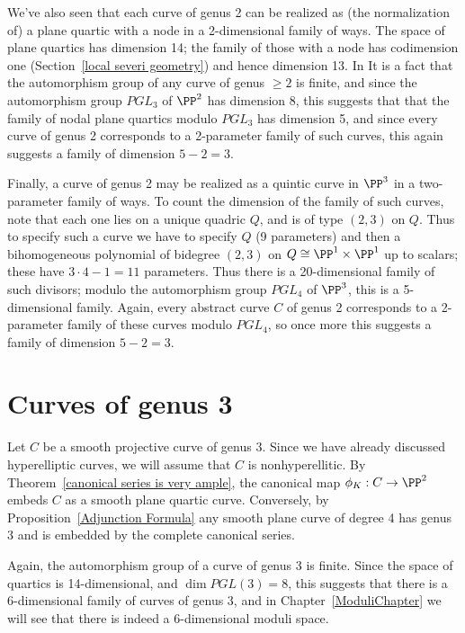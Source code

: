 We've also seen that each curve of genus 2 can be realized as (the normalization of) a plane quartic  with a node in a 2-dimensional family of ways. The space of plane quartics has dimension 14; the family of those with a node has codimension one (Section~\ref{local severi geometry}) and hence dimension 13. In It is a fact that the automorphism group of any curve of genus $\geq 2$ is finite, and since  the automorphism group $PGL_3$ of $\PP^2$ has dimension 8, this suggests that that the family of nodal plane quartics modulo $PGL_3$ has dimension 5, and since every curve of genus 2 corresponds to a 2-parameter family of such curves, this again suggests a family of dimension $ 5-2=3$.

Finally, a curve of genus 2 may be realized as a quintic curve in $\PP^3$ in a two-parameter family of ways. To count the dimension of the family of such curves, note that each one lies on a unique quadric $Q$, and is of type $(2,3)$ on $Q$. Thus to specify such a curve we have to specify $Q$ (9 parameters) and then a bihomogeneous polynomial of bidegree $(2,3)$ on $Q \cong \PP^1 \times \PP^1$ up to scalars; these have $3\cdot 4 - 1 = 11$ parameters. Thus there is a 20-dimensional family of such divisors; modulo the automorphism group $PGL_4$ of $\PP^3$, this is a 5-dimensional family. Again, every abstract curve $C$ of genus 2 corresponds to a 2-parameter family of these curves modulo $PGL_4$, so once more this suggests a family of dimension $ 5 - 2 = 3$.

\section{Curves of genus 3}

Let $C$ be a smooth projective curve of genus 3. Since we have already discussed hyperelliptic curves, 
we will assume  that $C$ is nonhyperellitic. By  Theorem~\ref{canonical series is very ample}, the canonical map $\phi_K : C \to \PP^2$ embeds $C$ as a smooth plane quartic curve. Conversely, by Proposition~\ref{Adjunction Formula} any smooth plane curve of degree 4 has genus 3 and is embedded by the complete canonical series. 

Again, the automorphism group of a curve of genus 3 is finite. Since the space of quartics is 14-dimensional, and $\dim PGL(3) = 8$, this suggests that
there is a 6-dimensional family of curves of genus 3, and in Chapter~\ref{ModuliChapter}
we will see that there is indeed a 6-dimensional moduli space.

